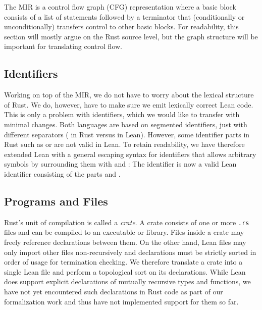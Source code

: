 The MIR is a control flow graph (CFG) representation where a basic block consists
of a list of statements followed by a terminator that (conditionally or
unconditionally) transfers control to other basic blocks. For readability,
this section will mostly argue on the Rust source level, but the graph structure
will be important for translating control flow.


\subsection{Identifiers}

Working on top of the MIR, we do not have to worry about the lexical structure
of Rust. We do, however, have to make sure we emit lexically correct Lean code.
This is only a problem with identifiers, which we would like to transfer with
minimal changes. Both languages are based on segmented identifiers, just with
different separators ( in Rust versus  in Lean).
However, some identifier parts in Rust such as \rust{[T]} or 
are not valid in Lean. To retain readability, we have therefore extended Lean
with a general escaping syntax for identifiers that allows arbitrary symbols by
surrounding them with  and : The identifier 
is now a valid Lean identifier consisting of the parts  and
.

\subsection{Programs and Files}

Rust's unit of compilation is called a \emph{crate}. A crate consists of one or
more \texttt{.rs} files and can be compiled to an executable or library. Files
inside a crate may freely reference declarations between them. On the other
hand, Lean files may only import other files non-recursively and declarations
must be strictly sorted in order of usage for termination checking. We therefore
translate a crate into a single Lean file and perform a topological sort on its
declarations. While Lean does support explicit declarations of mutually
recursive types and functions, we have not yet encountered such declarations in
Rust code as part of our formalization work and thus have not implemented support for them so far.


